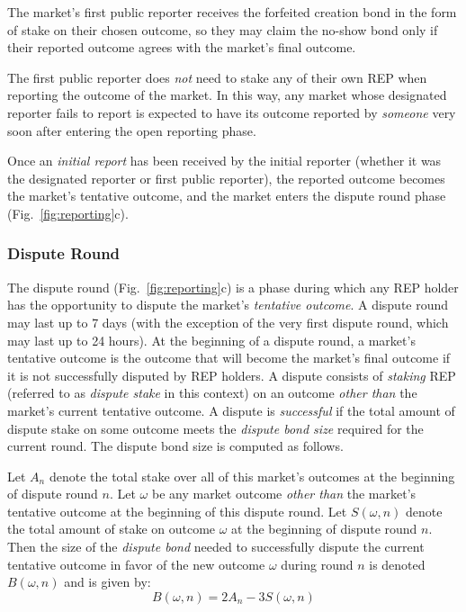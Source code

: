 \documentclass[floatfix,reprint,nofootinbib,amsmath,amssymb,epsfig,pre,floats,letterpaper,groupedaffiliation]{revtex4-1}
\newcommand{\beq}{\begin{equation}}
\newcommand{\eeq}{\end{equation}}
\theoremstyle{definition}
\theoremstyle{definition}
\begin{document}
The market's first public reporter receives the forfeited creation bond in the form of stake on their chosen outcome, so they may claim the no-show bond only if their reported outcome agrees with the market's final outcome.

The first public reporter does \textit{not} need to stake any of their own REP when reporting the outcome of the market.  In this way, any market whose designated reporter fails to report is expected to have its outcome reported by \textit{someone} very soon after entering the open reporting phase.

Once an \textit{initial report} has been received by the initial reporter (whether it was the designated reporter or first public reporter), the reported outcome becomes the market's tentative outcome, and the market enters the dispute round phase (Fig.~\ref{fig:reporting}c).

\subsubsection{Dispute Round}

The dispute round (Fig.~\ref{fig:reporting}c) is a phase during which any REP holder has the opportunity to dispute the market's \textit{tentative outcome}. A dispute round may last up to 7 days (with the exception of the very first dispute round, which may last up to 24 hours). At the beginning of a dispute round, a market's tentative outcome is the outcome that will become the market's final outcome if it is not successfully disputed by REP holders. A dispute consists of \textit{staking} REP (referred to as \textit{dispute stake} in this context) on an outcome \textit{other than} the market's current tentative outcome.  A dispute is \textit{successful} if the total amount of dispute stake on some outcome meets the \textit{dispute bond size} required for the current round.  The dispute bond size is computed as follows.

Let $A_n$ denote the total stake over all of this market's outcomes at the beginning of dispute round $n$.  Let $\omega$ be any market outcome \textit{other than} the market's tentative outcome at the beginning of this dispute round.  Let $S(\omega, n)$ denote the total amount of stake on outcome $\omega$ at the beginning of dispute round $n$.  Then the size of the \textit{dispute bond} needed to successfully dispute the current tentative outcome in favor of the new outcome $\omega$ during round $n$ is denoted $B(\omega, n)$ and is given by:
\beq \label{eq:bond_size}
B(\omega, n) = 2A_n - 3S(\omega, n)
\eeq
\end{document}
